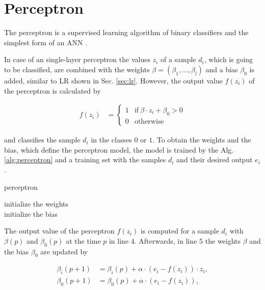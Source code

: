 \section{Perceptron}
\label{sec:perceptron}

The perceptron is a supervised learning algorithm of binary classifiers and the simplest form of an \ac{ANN} \cite{Rosenblatt1957TheAutomaton}. 

In case of an single-layer perceptron the values $z_i$ of a sample $d_i$, which is going to be classified, are combined with the weights $\beta =(\beta_1, ..., \beta_l)$ and a bias $\beta_0$ is added, similar to \ac{LR} shown in Sec. \ref{sec:lr}.
However, the output value $f(z_i)$ of the perceptron is calculated by

\begin{align*}
f(z_i) &= \begin{cases}
1 & \text{if}\ \beta \cdot z_i + \beta_0 > 0\\
0 & \text{otherwise}
\end{cases}
\end{align*}

and classifies the sample $d_i$ in the classes $0$ or $1$.
To obtain the weights and the bias, which define the perceptron model, the model is trained by the Alg. \ref{alg:perceptron} and a training set with the samples $d_i$ and their desired output $e_i$.

\SetAlCapHSkip{0.2em}
\begin{algorithm}[H]
\Indm
\SetAlgoLined
\caption{perceptron}
\label{alg:perceptron}
\Indp

initialize the weights\\ %
initialize the bias\\ %

\end{algorithm}

The output value of the perceptron $f(z_i)$ is computed for a sample $d_i$ with $\beta(p)$ and $\beta_0(p)$ at the time $p$ in line $4$.
Afterwards, in line $5$ the weights $\beta$ and the bias $\beta_0$ are updated by

\begin{align*}
\beta_i(p+1) &= \beta_i(p) + \alpha \cdot (e_i - f(z_i)) \cdot z_i,\\
\beta_0(p+1) &= \beta_0(p) + \alpha \cdot (e_i - f(z_i)),
\end{align*}

